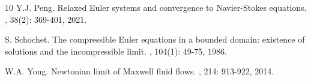 \documentclass[10pt,reqno]{amsart}
\numberwithin{equation}{section}
\begin{document}
\begin{thebibliography}{10}
		Y.J. Peng.
		\newblock Relaxed Euler systems and convergence to Navier-Stokes equations.
		, 38(2): 369-401, 2021.
		
		S. Schochet.
		\newblock The compressible Euler equations in a bounded domain: existence of
		solutions and the incompressible limit.
		, 104(1): 49-75, 1986.
		
		
		
		W.A. Yong.
		\newblock Newtonian limit of Maxwell fluid flows.
		, 214: 913-922, 2014.
		
	\end{thebibliography}
	
	
	
	
	
	
	
	
	
	
	
	
	
	
	
	
\end{document}
